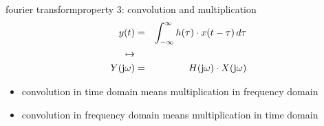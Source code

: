         \begin{frame}{fourier transform}{property 3: convolution and multiplication}
            \vspace{-5mm}
            \begin{eqnarray*}
                y(t) &=& \int_{-\infty}^{\infty} {h(\tau) \cdot x(t-\tau)\, d\tau}\\\mapsto &&\\
                Y(\mathrm{j}\omega) &=& H(\mathrm{j}\omega)\cdot X(\mathrm{j}\omega) \nonumber
            \end{eqnarray*}
            
            \bigskip
            \begin{itemize}
                \item<2->   convolution in time domain means multiplication in frequency domain
                \item<2->   convolution in frequency domain means multiplication in time domain
            \end{itemize}
            
        \end{frame}	

